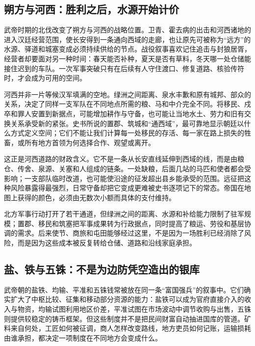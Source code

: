 \subsection{朔方与河西：胜利之后，水源开始计价}

武帝时期的北伐改变了朔方与河西的战略位置。卫青、霍去病的出击和河西诸地的进入汉廷经营范围，使长安得到一条通向西域的走廊，也让原先可被称为“远方”的水源、驿道和城塞变成必须持续供给的节点。战役叙事喜欢记住追击与封狼居胥，经营者却要面对另一种时间：春天能否补种，夏天是否有草料，冬天哪一处仓储能接住迟到的车队。一次军事突破只有在后续有人守住渡口、修复道路、核验传符时，才会成为可用的空间。

河西并非一片等候汉军填满的空地。绿洲之间距离、泉水丰歉和原有城邦、部众的关系，决定了同样一支军队在不同地点所需的粮、马和中介完全不同。将移民、戍卒和罪人安置到新据点，可能增加耕作与守备，也可能让当地水土、劳力和旧有交换关系承受新的紧张。史书所说的置郡、筑城和“通西域”，最可靠地显示朝廷以什么方式定义空间；它们不能让我们计算每一处移民的存活、每一家在路上损失的牲畜，或所有地方首领为何选择合作、观望或离开。

这正是河西道路的财政含义。它不是一条从长安直线延伸到西域的线，而是由粮仓、传舍、泉源、关塞和人组成的链条。一处缺粮，后面几站的马匹和使者都会受影响；一支部队临时改道，也可能使沿途的征发超出县乡能承受的范围。远征把这种风险暴露得最强烈，日常守备却把它变成更难被史书逐项记下的常态。帝国在地图上获得的颜色，必须由无数次小额而具体的支付维持。

\begin{causalchain}[河西的取得为何不能只按战功计算]
北方军事行动打开了若干通道，但绿洲之间的距离、水源和补给能力限制了驻军规模；置郡、移民和筑塞把军事成果转为行政据点，同时提高了粮运、劳役和基层协调的需求。后来使节、商旅和屯田能够经过这里，不是因为一场胜利已经消除了风险，而是因为这些成本被反复转给仓储、道路和沿线家庭承担。
\end{causalchain}

\subsection{盐、铁与五铢：不是为边防凭空造出的银库}

武帝朝的盐铁、均输、平准和五铢钱常被放在同一条“富国强兵”的叙事中。它们确实扩大了中枢比较、征集和移动部分资源的能力：盐铁可以成为官府直接介入的收入与物资，均输试图利用地区价差，平准试图在市场波动中调节收购与出售，五铢则提供较稳定的铸币框架。但这些制度并不是把民间财富自动抽进国库的管道。矿料来自何处，工匠如何被征调，商人怎样改变路线，地方吏员如何记账，运输损耗由谁承担，都决定一项制度在不同地方会变成什么。

